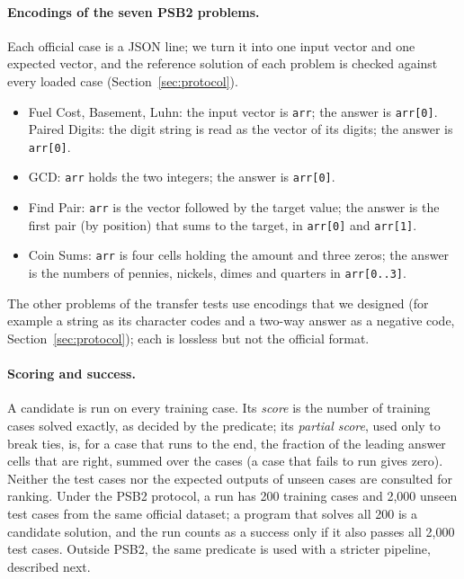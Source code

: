 \documentclass[sigconf,nonacm]{acmart}
\begin{document}
\paragraph{Encodings of the seven PSB2 problems.} Each official case is a JSON line; we turn it into one input vector and one expected vector, and the reference solution of each problem is checked against every loaded case (Section~\ref{sec:protocol}).
\begin{itemize}
  \item Fuel Cost, Basement, Luhn: the input vector is \texttt{arr}; the answer is \texttt{arr[0]}. Paired Digits: the digit string is read as the vector of its digits; the answer is \texttt{arr[0]}.
  \item GCD: \texttt{arr} holds the two integers; the answer is \texttt{arr[0]}.
  \item Find Pair: \texttt{arr} is the vector followed by the target value; the answer is the first pair (by position) that sums to the target, in \texttt{arr[0]} and \texttt{arr[1]}.
  \item Coin Sums: \texttt{arr} is four cells holding the amount and three zeros; the answer is the numbers of pennies, nickels, dimes and quarters in \texttt{arr[0..3]}.
\end{itemize}
The other problems of the transfer tests use encodings that we designed (for example a string as its character codes and a two-way answer as a negative code, Section~\ref{sec:protocol}); each is lossless but not the official format.

\paragraph{Scoring and success.} A candidate is run on every training case. Its \emph{score} is the number of training cases solved exactly, as decided by the predicate; its \emph{partial score}, used only to break ties, is, for a case that runs to the end, the fraction of the leading answer cells that are right, summed over the cases (a case that fails to run gives zero). Neither the test cases nor the expected outputs of unseen cases are consulted for ranking.
Under the PSB2 protocol, a run has 200 training cases and 2,000 unseen test cases from the same official dataset; a program that solves all 200 is a candidate solution, and the run counts as a success only if it also passes all 2,000 test cases.
Outside PSB2, the same predicate is used with a stricter pipeline, described next.
\end{document}
